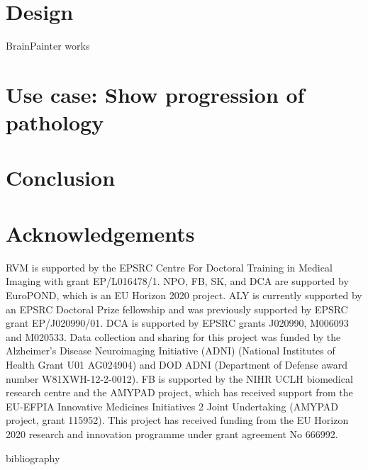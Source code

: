 \documentclass[final,5p,times,twocolumn,authoryear]{elsarticle}
\begin{document}
\section{Design}
\label{design}



BrainPainter works 



\FloatBarrier
\section{Use case: Show progression of pathology}
\label{design}


\section{Conclusion} 




\FloatBarrier
\section{Acknowledgements}




RVM is supported by the EPSRC Centre For Doctoral Training in Medical Imaging with grant EP/L016478/1. NPO, FB, SK, and DCA are supported by EuroPOND, which is an EU Horizon 2020 project. ALY is currently supported by an EPSRC Doctoral Prize fellowship and was previously supported by EPSRC grant EP/J020990/01. DCA is supported by EPSRC grants J020990, M006093 and M020533. Data collection and sharing for this project was funded by the Alzheimer's Disease Neuroimaging Initiative (ADNI) (National Institutes of Health Grant U01 AG024904) and DOD ADNI (Department of Defense award number W81XWH-12-2-0012). FB is supported by the NIHR UCLH biomedical research centre and the AMYPAD project, which has received support from the EU-EFPIA Innovative Medicines Initiatives 2 Joint Undertaking (AMYPAD project, grant 115952). This project has received funding from the EU Horizon 2020 research and innovation programme under grant agreement No 666992.

bibliography





\end{document}
